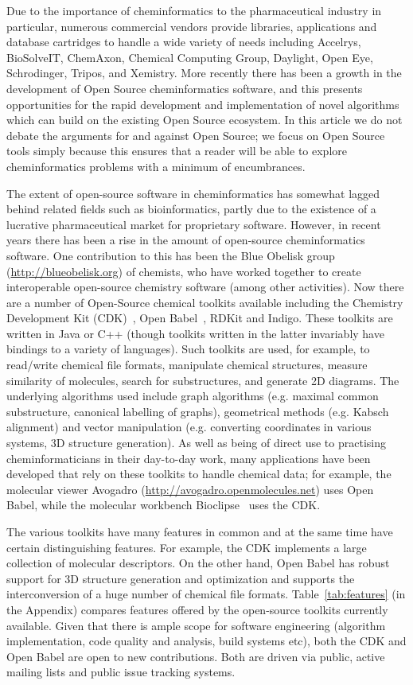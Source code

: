 \documentclass{sig-alternate}
\begin{document}
Due to the importance of cheminformatics to the pharmaceutical
industry in particular, numerous commercial vendors provide libraries,
applications and database cartridges to handle a wide variety of
needs including Accelrys, BioSolveIT, ChemAxon, Chemical Computing Group,
Daylight, Open Eye, Schrodinger, Tripos, and Xemistry. More recently
there has been a growth in the development of Open
Source cheminformatics software, and this presents opportunities for
the rapid development and implementation of novel algorithms which can
build on the existing Open Source ecosystem. In this article we do not debate the
arguments for and against Open Source; we focus on Open Source
tools simply because this ensures that a reader will be able to explore
cheminformatics problems with a minimum of encumbrances.

The extent of open-source software in cheminformatics has somewhat
lagged behind related fields such as bioinformatics, partly due to the
existence of a lucrative pharmaceutical market for proprietary
software. However, in recent years there has been a rise in the amount
of open-source cheminformatics software. One contribution to this has
been the Blue Obelisk group~\cite{BlueObelisk2011}
(\url{http://blueobelisk.org}) of chemists, who have worked together
to create interoperable open-source chemistry software (among other
activities). Now there are a number of Open-Source chemical toolkits
available including the Chemistry Development Kit
(CDK)~\cite{steinbeck2003}, Open Babel~\cite{openbabel2011}, RDKit and
Indigo. These toolkits are written in Java or C++ (though toolkits
written in the latter invariably have bindings to a variety of
languages). Such toolkits are used, for example, to read/write
chemical file formats, manipulate chemical structures, measure
similarity of molecules, search for substructures, and generate 2D
diagrams. The underlying algorithms used include graph algorithms
(e.g. maximal common substructure, canonical labelling of graphs),
geometrical methods (e.g. Kabsch alignment) and vector manipulation
(e.g. converting coordinates in various systems, 3D structure
generation). As well as being of direct use to practising
cheminformaticians in their day-to-day work, many applications have
been developed that rely on these toolkits to handle chemical data;
for example, the molecular viewer Avogadro
(\url{http://avogadro.openmolecules.net}) uses Open Babel, while the
molecular workbench Bioclipse~\cite{Bioclipse2} uses the CDK.

The various toolkits have many features in common and at the same time
have certain distinguishing features. For example, the CDK implements
a large collection of molecular descriptors. On the other hand, Open
Babel has robust support for 3D structure generation and optimization
and supports the interconversion of a huge number of chemical file
formats. Table~\ref{tab:features} (in the Appendix) compares features
offered by the open-source toolkits currently available.  Given that
there is ample scope for software engineering (algorithm
implementation, code quality and analysis, build systems etc), both
the CDK and Open Babel are open to new contributions. Both are driven
via public, active mailing lists and public issue tracking systems.
\end{document}

